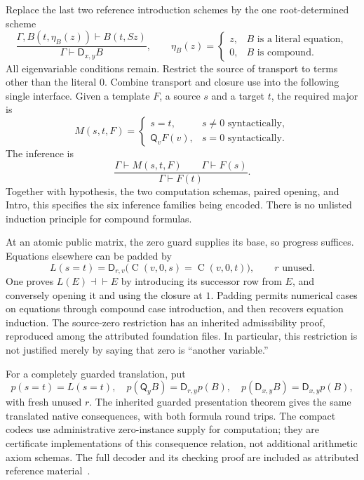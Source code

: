 \documentclass[11pt]{article}
\theoremstyle{definition}
\theoremstyle{remark}
\newcommand{\D}{\mathsf D}
\newcommand{\Q}{\mathsf Q}
\newcommand{\Sel}{\operatorname{C}}
\begin{document}
Replace the last two reference introduction schemes by the one
root-determined scheme
\[
 \frac{\Gamma,B(t,\eta_B(z))\vdash B(t,Sz)}
      {\Gamma\vdash\D_{x,y}B},
 \qquad
 \eta_B(z)=\begin{cases}
 z,&B\text{ is a literal equation},\\
 0,&B\text{ is compound}.
 \end{cases}
 \tag{Intro}
\]
All eigenvariable conditions remain.  Restrict the source of transport to
terms other than the literal $0$.  Combine transport and closure use into
the following single interface.  Given a template $F$, a source $s$ and a
target $t$, the required major is
\[
 M(s,t,F)=\begin{cases}s=t,&s\ne 0\text{ syntactically},\\
                         \Q_vF(v),&s=0\text{ syntactically}.
          \end{cases}
\]
The inference is
\[
 \frac{\Gamma\vdash M(s,t,F)\qquad\Gamma\vdash F(s)}
      {\Gamma\vdash F(t)}.\tag{Use/transport}
\]
Together with hypothesis, the two computation schemas, paired opening,
and Intro, this specifies the six inference families being encoded.
There is no unlisted induction principle for compound formulas.

At an atomic public matrix, the zero guard supplies its base, so progress
suffices.  Equations elsewhere can be padded by
\[
 L(s=t)=\D_{r,v}\bigl(\Sel(v,0,s)=\Sel(v,0,t)\bigr),
 \qquad r\text{ unused}.
\]
One proves $L(E)\dashv\vdash E$ by introducing its successor row from $E$,
and conversely opening it and using the closure at $1$.  Padding permits
numerical cases on equations through compound case introduction, and then
recovers equation induction.  The source-zero restriction has an inherited
admissibility proof, reproduced among the attributed foundation files.
In particular, this restriction is not justified merely by saying that
zero is ``another variable.''

For a completely guarded translation, put
\[
 p(s=t)=L(s=t),\quad
 p(\Q_yB)=\D_{r,y}p(B),\quad
 p(\D_{x,y}B)=\D_{x,y}p(B),
\]
with fresh unused $r$.  The inherited guarded presentation theorem gives
the same translated native consequences, with both formula round trips.
The compact codecs use administrative zero-instance supply for computation;
they are certificate implementations of this consequence relation, not
additional arithmetic axiom schemas.  The full decoder and its checking
proof are included as attributed reference material~\cite{arity}.
\end{document}
